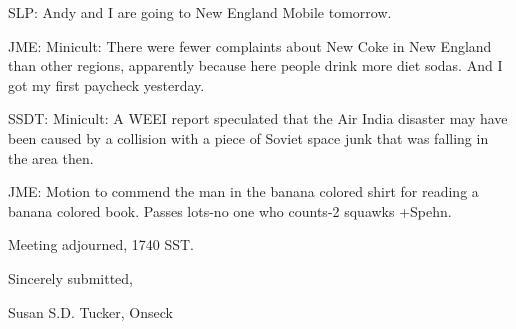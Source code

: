 \documentclass[12pt]{article}
\begin{document}
SLP: Andy and I are going to New England Mobile tomorrow.

JME: Minicult: There were fewer complaints about New Coke in New England than other regions, apparently because here people drink more diet sodas. And I got my first paycheck yesterday.

SSDT: Minicult: A WEEI report speculated that the Air India disaster may have been caused by a collision with a piece of Soviet space junk that was falling in the area then.

JME: Motion to commend the man in the banana colored shirt for reading a banana colored book. Passes lots-no one who counts-2 squawks +Spehn.

\vspace{12pt}

\noindent
Meeting adjourned, 1740 SST.

\vspace{18pt}

\centerline{Sincerely submitted,}
\centerline{Susan S.D. Tucker, Onseck}
\end{document}
